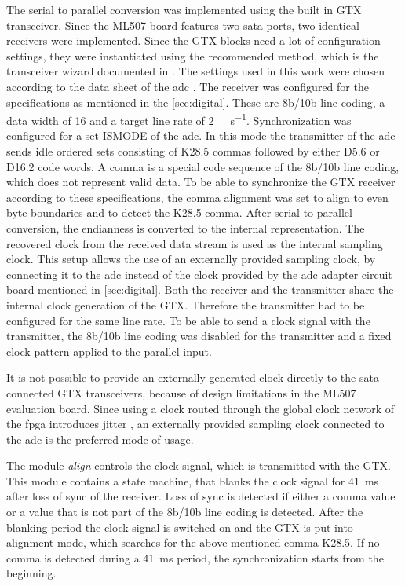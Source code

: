 \documentclass[12pt,a4paper,parskip=full,abstract=true,BCOR=12mm,twoside,open=right]{scrreprt}
\def\device#1{\textit{#1}}
\begin{document}
The serial to parallel conversion was implemented using the built in GTX
transceiver. Since the ML507 board features two \gls{sata} ports, two
identical receivers were implemented. Since the GTX blocks need
a lot of configuration settings, they were instantiated using the
recommended method, which is the transceiver wizard documented in \cite{gtx_wizard}. The
settings used in this work were chosen according to the data sheet
of the \gls{adc} \cite{ltc2274}. The receiver was configured for the
specifications as mentioned in the \cref{sec:digital}. These are 8b/10b line coding,
a data width of \SI{16}{\bit} and a target line rate of \SI{2}{\giga\bit\per\second}.
Synchronization was configured for a set ISMODE of the \gls{adc}. In this mode the
transmitter of the \gls{adc} sends idle ordered sets consisting of
K28.5 commas followed by either D5.6 or D16.2 code words\cite{ltc2274}. A comma is a special
code sequence of the 8b/10b line coding, which does not represent valid data\cite{gtx}.
To be able to synchronize the GTX receiver according to these specifications, the comma
alignment was set to align to even byte boundaries and to detect the K28.5 comma. After
serial to parallel conversion, the endianness is converted to the internal representation.
The recovered clock from the received data stream is used as the internal sampling clock.
This setup allows the use of an externally provided sampling clock, by connecting it to
the \gls{adc} instead of the clock provided by the \gls{adc} adapter circuit board
mentioned in \cref{sec:digital}. Both the receiver and
the transmitter share the internal clock generation of the GTX. Therefore the transmitter
had to be configured for the same line rate. To be able to send a clock signal with the
transmitter, the 8b/10b line coding was disabled for the transmitter and a fixed clock pattern applied
to the parallel input.

It is not possible to provide an externally generated clock directly to the
\gls{sata} connected GTX transceivers, because of design limitations in the ML507 evaluation
board. Since using a clock routed through the global clock
network of the \gls{fpga} introduces jitter \cite{gtx}, an externally provided sampling clock
connected to the \gls{adc} is the preferred mode of usage.

The module \device{align} controls the clock signal, which is transmitted with
the GTX. This module contains a state machine, that blanks the clock signal
for \SI{41}{\milli\second} after loss of sync of the receiver. Loss of sync is
detected if either a comma value or a value that is not part of the 8b/10b line coding
is detected. After the blanking period the clock signal is switched on and
the GTX is put into alignment mode, which searches for the above mentioned comma
K28.5. If no comma is detected during a \SI{41}{\milli\second} period, the
synchronization starts from the beginning.
\end{document}
